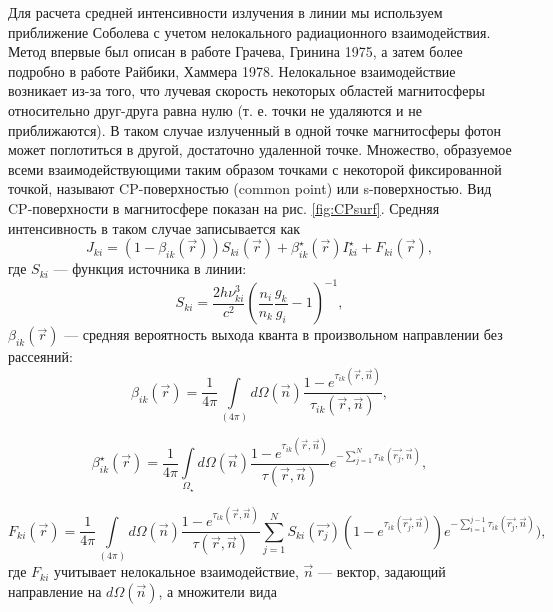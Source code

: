 \documentclass{article}
\begin{document}
Для расчета средней интенсивности излучения в линии мы используем приближение Соболева с учетом нелокального радиационного взаимодействия. Метод впервые был описан в работе Грачева, Гринина 1975, а затем более подробно в работе Райбики, Хаммера 1978. Нелокальное взаимодействие возникает из-за того, что лучевая скорость некоторых областей магнитосферы относительно друг-друга равна нулю (т. е. точки не удаляются и не приближаются). В таком случае излученный в одной точке магнитосферы фотон может поглотиться в другой, достаточно удаленной точке. Множество, образуемое всеми взаимодействующими таким образом точками с некоторой фиксированной точкой, называют CP-поверхностью (common point) или s-поверхностью. Вид CP-поверхности в магнитосфере показан на рис. \ref{fig:CPsurf}. Средняя интенсивность в таком случае записывается как
\FloatBarrier
\begin{equation} \label{eq:meanint}
J_{ki} = (1-\beta_{ik}(\vec{r}))S_{ki}(\vec{r}) + \beta_{ik}^\star(\vec{r})I^\star_{ki} + F_{ki}(\vec{r}),
\end{equation}
где $S_{ki}$ --- функция источника в линии:
\begin{equation} \label{eq:source}
S_{ki} = \frac{2h\nu_{ki}^3}{c^2}\left( \frac{n_i}{n_k} \frac{g_k}{g_i} - 1 \right)^{-1},
\end{equation}
$\beta_{ik}(\vec{r})$ --- средняя вероятность выхода кванта в произвольном направлении без рассеяний:
\begin{equation} \label{eq:beta}
\beta_{ik}(\vec{r}) = \frac{1}{4\pi}\int\limits_{(4\pi)} d\Omega(\vec{n})\frac{1-e^{\tau_{ik}(\vec{r},\vec{n})}}{\tau_{ik}(\vec{r},\vec{n})}, 
\end{equation}

\begin{equation} \label{eq:starbeta}
\beta_{ik}^\star(\vec{r}) = \frac{1}{4\pi}\int\limits_{\Omega_\star} d\Omega(\vec{n})\frac{1-e^{\tau_{ik}(\vec{r},\vec{n})}}{\tau(\vec{r},\vec{n})}e^{-\sum_{j=1}^N\tau_{ik}(\vec{r_j},\vec{n})},
\end{equation}

\begin{equation} \label{eq:CPF}
F_{ki}(\vec{r}) = \frac{1}{4\pi}\int\limits_{(4\pi)} d\Omega(\vec{n})\frac{1-e^{\tau_{ik}(\vec{r},\vec{n})}}{\tau(\vec{r},\vec{n})}\sum\limits_{j=1}^N S_{ki}(\vec{r_j}) (1-e^{\tau_{ik}(\vec{r_j},\vec{n})}) e^{-\sum_{i=1}^{j-1}\tau_{ik}(\vec{r_j},\vec{n})}),
\end{equation}
где $F_{ki}$ учитывает нелокальное взаимодействие, $\vec{n}$ --- вектор, задающий направление на $d\Omega(\vec{n})$, а множители вида
 
\end{document}
